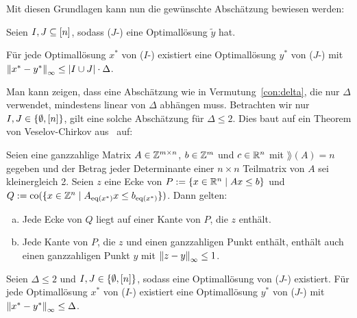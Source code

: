 Mit diesen Grundlagen kann nun die gewünschte Abschätzung bewiesen werden:

\renewcommand{\thetheorem}{2.11}
\begin{theorem}\label{thm:theo2}
	Seien $I,J\subseteq[n]$, sodass ($J$-\MIPI) eine Optimallösung $\tilde{y}$ hat.
	
	Für jede Optimallösung $x^*$ von ($I$-\MIPI) existiert eine Optimallösung $y^*$ von ($J$-\MIPI) mit $\left\lVert x^*-y^*\right\rVert_\infty\leq\lvert I\cup J \rvert\cdot\Delta$.
\end{theorem}

Man kann zeigen, dass eine Abschätzung wie in Vermutung~\ref{con:delta}, die nur $\Delta$ verwendet, mindestens linear von $\Delta$ abhängen muss.
Betrachten wir nur $I,J\in\{\emptyset, [n] \}$, gilt eine solche Abschätzung für $\Delta\leq 2$.
Dies baut auf ein Theorem von Veselov-Chirkov aus~\cite[Theorem 2 und Beweis]{VESELOV2009220} auf:
\begin{lemma}\label{lem:veselov}
	Seien eine ganzzahlige Matrix $A\in\mathbb{Z}^{m\times n}$, $b\in\mathbb{Z}^m$ und $c\in\mathbb{R}^n$ mit $\rang(A)=n$ gegeben und der Betrag jeder Determinante einer $n\times n$ Teilmatrix von $A$ sei kleinergleich 2.
	Seien $z$ eine Ecke von $P:=\{x\in\mathbb{R}^n\mid Ax\leq b \}$ und $Q:=\operatorname{co}(\{x\in\mathbb{Z}^n \mid A_{\operatorname{eq}(x^*)}x \leq b_{\operatorname{eq}(x^*)} \})$.
	Dann gelten:
	\begin{enumerate}[(a)]
		\item Jede Ecke von $Q$ liegt auf einer Kante von $P$, die $z$ enthält.
		\item Jede Kante von $P$, die $z$ und einen ganzzahligen Punkt enthält, enthält auch einen ganzzahligen Punkt $y$ mit $\left\lVert z -y\right\rVert_\infty\leq 1$.
	\end{enumerate}
\end{lemma}

\begin{theorem}
	Seien $\Delta\leq 2$ und $I,J\in\{\emptyset,[n]\}$, sodass eine Optimallösung von \mbox{($J$-\MIPI)} existiert.
	Für jede Optimallösung $x^*$ von ($I$-\MIPI) existiert eine Optimallösung $y^*$ von ($J$-\MIPI) mit $\left\lVert x^*-y^*\right\rVert_\infty\leq \Delta$.
\end{theorem}
